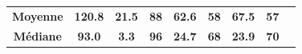 \documentclass[french]{beamer}
\newcommand{\B}[1]{\textbf{#1}}	%
\def\s{\hphantom{0}}	%
\begin{document}
{\begin{frame}
\begin{center}
{\begin{tabular}{ccccccccc}
\B{Moyenne} & \B{120.8} & \B{\s21.5} & \B{88} & \B{\s62.6} & \B{58} & \B{\s67.5} & \B{57} &   \\
\B{Médiane} & \B{\s93.0} & \B{\s3.3} & \B{96} & \B{\s24.7} & \B{68} & \B{\s23.9} & \B{70} &  \\
\bottomrule    
\end{tabular}
}

\end{center}
\end{frame}


}
\end{document}
